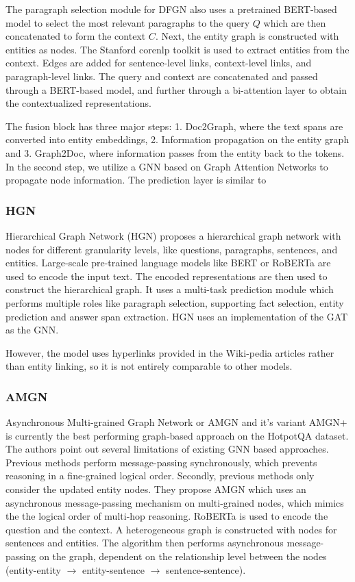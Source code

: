 \documentclass[sigplan,screen,nonacm]{acmart}
\begin{document}
The paragraph selection module for DFGN also uses a pretrained BERT-based model \cite{RN153} to select the most relevant paragraphs to the 
query $Q$ which are then concatenated to form the context $C$. Next, the entity graph is constructed with entities as nodes. The Stanford 
corenlp toolkit \cite{RN170} is used to extract entities from the context. Edges are added for sentence-level links, context-level links, 
and paragraph-level links. The query and context are concatenated and passed through a BERT-based model, and further through a bi-attention 
layer to obtain the contextualized representations.

The fusion block has three major steps: 1. Doc2Graph, where the text spans are converted into entity embeddings, 2. Information propagation on 
the entity graph and 3. Graph2Doc, where information passes from the entity back to the tokens. In the second step, we utilize a GNN based on 
Graph Attention Networks \cite{RN7} to propagate node information. The prediction layer is similar to \cite{RN116}

\subsubsection{HGN}
Hierarchical Graph Network (HGN) \cite{RN119} proposes a hierarchical graph network with nodes for different granularity levels, like questions, 
paragraphs, sentences, and entities. Large-scale pre-trained language models like BERT \cite{RN153} or RoBERTa \cite{RN171} are used to encode 
the input text. The encoded representations are then used to construct the hierarchical graph. It uses a multi-task prediction module which 
performs multiple roles like paragraph selection, supporting fact selection, entity prediction and answer span extraction. HGN uses an 
implementation of the GAT \cite{RN7} as the GNN.

However, the model uses hyperlinks provided in the Wiki-pedia articles rather than entity linking, so it is not entirely comparable to other 
models.

\subsubsection{AMGN}
Asynchronous Multi-grained Graph Network \cite{RN131} or AMGN and it's variant AMGN+ is currently the best performing graph-based approach on the HotpotQA dataset.
The authors point out several limitations of existing GNN based approaches. Previous methods perform message-passing synchronously,
which prevents reasoning in a fine-grained logical order. Secondly, previous methods only consider the  updated entity nodes.
They propose AMGN which uses an asynchronous message-passing mechanism on multi-grained nodes, which mimics the the logical order of multi-hop 
reasoning. RoBERTa \cite{RN171} is used to encode the question and the context. A heterogeneous graph is constructed with nodes for sentences 
and entities. The algorithm then performs asynchronous message-passing on the graph, dependent on the relationship level between the nodes 
(entity-entity $\to$ entity-sentence $\to$ sentence-sentence).
\end{document}
